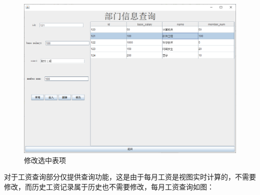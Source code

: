 \documentclass[withoutpreface,bwprint]{cumcmthesis} %
\begin{document}
\begin{figure}[H]
    \centering
    \includegraphics[width=1\linewidth]{change}
    \caption{修改选中表项}
\end{figure}
对于工资查询部分仅提供查询功能，这是由于每月工资是视图实时计算的，不需要修改，而历史工资记录属于历史也不需要修改，每月工资查询如图：
\end{document}
